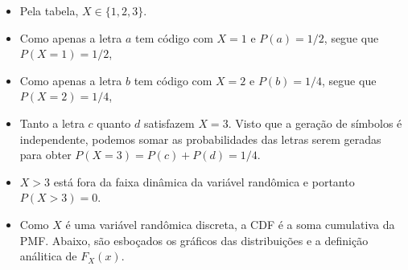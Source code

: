 \begin{itemize}
    \item [a)]
    Pela tabela, $X\in \{1, 2, 3\}$.
    
    \item [b)] 
    Como apenas a letra $a$ tem código com $X=1$ e $P(a)=1/2$, 
    segue que $P(X=1) = 1/2$,
    
    \item [c)]
    Como apenas a letra $b$ tem código com $X=2$ e $P(b)=1/4$, 
    segue que $P(X=2) = 1/4$,
    
    \item [d)] 
    Tanto a letra $c$ quanto $d$ satisfazem $X=3$. 
    Visto que a geração de símbolos é independente, podemos somar as probabilidades
    das letras serem geradas para obter $P(X=3) = P(c) + P(d) = 1/4$.
    
    \item [e)] 
    $X>3$ está fora da faixa dinâmica da variável randômica e portanto $P(X>3)=0$.
    
    \item [f)]
    Como $X$ é uma variável randômica discreta, a CDF é a soma cumulativa da PMF.
    Abaixo, são esboçados os gráficos das distribuições e a definição análitica de $F_X(x)$.
    

\end{itemize}
